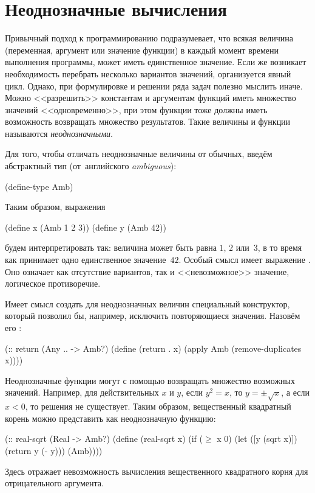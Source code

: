 
\section{Неоднозначные вычисления}%
Привычный подход к программированию подразумевает, что всякая величина (переменная, аргумент или значение функции) в каждый момент времени выполнения программы, может иметь единственное значение. Если же возникает необходимость перебрать несколько вариантов значений, организуется явный цикл.
Однако, при формулировке и решении ряда задач полезно мыслить иначе. Можно <<разрешить>> константам и аргументам функций иметь множество значений <<одновременно>>, при этом функции тоже должны иметь возможность возвращать множество результатов. Такие величины и функции называются \emph{неоднозначными}.

Для того, чтобы отличать неоднозначные величины от обычных, введём абстрактный тип  (от~английского \emph{ambiguous}):
\begin{SchemeCode}
(define-type Amb)
\end{SchemeCode}
Таким образом, выражения
\begin{SchemeCode}
(define x (Amb 1 2 3))
(define y (Amb 42))
\end{SchemeCode}
будем интерпретировать так: величина  может быть равна $1$, $2$ или~$3$, в то время как  принимает одно единственное значение~$42$. Особый смысл имеет выражение . Оно означает как отсутствие вариантов, так и <<невозможное>> значение, логическое противоречие.

Имеет смысл создать для неоднозначных величин специальный конструктор, который позволил бы, например, исключить повторяющиеся значения. Назовём его :
\begin{SchemeCode}
(:: return (Any .. -> Amb?)
 (define (return . x) 
   (apply Amb (remove-duplicates x))))
\end{SchemeCode}

Неоднозначные функции могут с помощью  возвращать множество возможных значений. Например, для действительных $x$ и $y$, если $y^2 = x$, то $y = \pm\sqrt{x}$, а если $x<0$, то решения не существует. Таким образом, вещественный квадратный корень можно представить как неоднозначную функцию:
\label{real-sqrt}%
\begin{SchemeCode}
(:: real-sqrt (Real -> Amb?)
  (define (real-sqrt x)
    (if ($\ge$ x 0) 
        (let ([y (sqrt x)]) (return y (- y)))
        (Amb))))
\end{SchemeCode}
Здесь  отражает невозможность вычисления вещественного квадратного корня для отрицательного аргумента.

